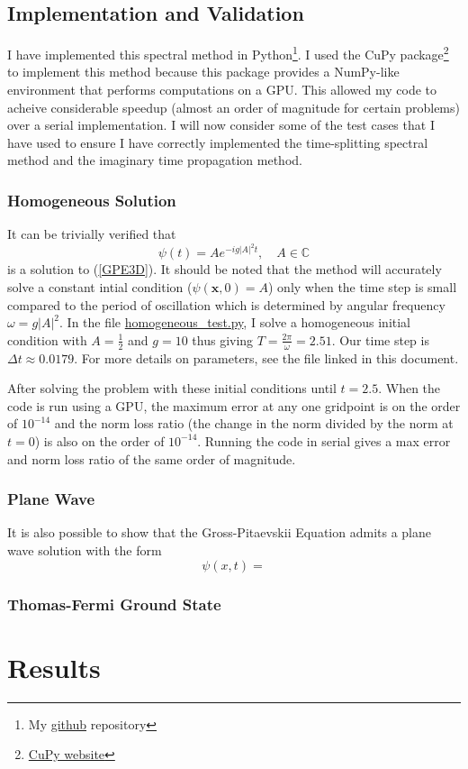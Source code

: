\documentclass[12]{article}
\begin{document}
\subsection{Implementation and Validation}

I have implemented this spectral method in Python\footnote{My \href{https://github.com/TimSkaras/GPE-SpectralMethod}{github} repository}. I used the CuPy package\footnote{\href{https://cupy.chainer.org}{CuPy website}} to implement this method because this package provides a NumPy-like environment that performs computations on a GPU. This allowed my code to acheive considerable speedup (almost an order of magnitude for certain problems) over a serial implementation. I will now consider some of the test cases that I have used to ensure I have correctly implemented the time-splitting spectral method and the imaginary time propagation method.

\subsubsection{Homogeneous Solution}

It can be trivially verified that
\begin{equation}
\psi(t) = A e^{-i g|A|^2 t}, \quad A \in \mathbb{C}
\end{equation}
is a solution to (\ref{GPE3D}). It should be noted that the method will accurately solve a constant intial condition ($\psi(\textbf{x},0) = A$) only when the time step is small compared to the period of oscillation which is determined by angular frequency $\omega = g |A|^2$. In the file \href{https://github.com/TimSkaras/GPE-SpectralMethod/blob/master/Tests/homogeneous_test.py}{homogeneous\_test.py}, I solve a homogeneous initial condition with $A = \frac{1}{2}$ and $g = 10$ thus giving $T = \frac{2\pi}{\omega} = 2.51$. Our time step is $\Delta t \approx 0.0179$. For more details on parameters, see the file linked in this document.

After solving the problem with these initial conditions until $t = 2.5$. When the code is run using a GPU, the maximum error at any one gridpoint is on the order of $10^{-14}$ and the norm loss ratio (the change in the norm divided by the norm at $t=0$) is also on the order of $10^{-14}$. Running the code in serial gives a max error and norm loss ratio of the same order of magnitude.

\subsubsection{Plane Wave}

It is also possible to show that the Gross-Pitaevskii Equation admits a plane wave solution with the form
\begin{equation}
\psi(x,t) = 
\end{equation}

\subsubsection{Thomas-Fermi Ground State}

\section{Results}



\end{document}
